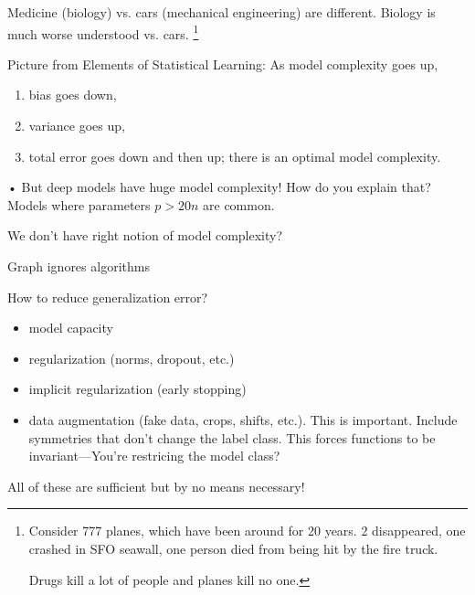 Medicine (biology) vs. cars (mechanical engineering) are different. Biology is much worse understood vs. cars. \footnote{Consider 777 planes, which have been around for 20 years. 2 disappeared, one crashed in SFO seawall, one person died from being hit by the fire truck.

Drugs kill a lot of people and planes kill no one.}




Picture from Elements of Statistical Learning:
As model complexity goes up, 
\begin{enumerate}
\item
bias goes down,
\item
variance goes up,
\item
total error goes down and then up; there is an optimal model complexity.
\end{enumerate}•
But deep models have huge model complexity! How do you explain that? Models where parameters $p>20n$ are common.

We don't have right notion of model complexity?

Graph ignores algorithms

How to reduce generalization error?
\begin{itemize}
\item
model capacity
\item
regularization (norms, dropout, etc.)
\item
implicit regularization (early stopping)
\item
data augmentation (fake data, crops, shifts, etc.). This is important. Include symmetries that don't change the label class.
This forces functions to be invariant---You're restricing the model class?
\end{itemize}
All of these are sufficient but by no means necessary!

